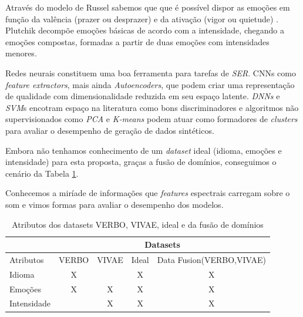 Através do modelo de Russel sabemos que que é possível dispor as emoções em função da valência (prazer ou desprazer) e da ativação (vigor ou quietude) \cite{27}. Plutchik decompõe emoções básicas de acordo com a intensidade, chegando a emoções compostas, formadas a partir de duas emoções com intensidades menores.

Redes neurais constituem uma boa ferramenta para tarefas de \textit{SER}. CNNs como \textit{feature extractors}, mais ainda \textit{Autoencoders}, que podem criar uma representação de qualidade com dimensionalidade reduzida em seu espaço latente. \textit{DNNs} e \textit{SVM}s encotram espaço na literatura como bons discriminadores e algoritmos não supervisionados como \textit{PCA} e \textit{K-means} podem atuar como formadores de \textit{clusters} para avaliar o desempenho de geração de dados sintéticos.

Embora não tenhamos conhecimento de um \textit{dataset} ideal (idioma, emoções e intensidade) para esta proposta, graças a fusão de domínios, conseguimos o cenário da Tabela \ref{table:datasetideal}.

Conhecemos a miríade de informações que \textit{features} espectrais carregam sobre o som e vimos formas para avaliar o desempenho dos modelos.

\begin{table}[!h]
\centering
\label{table:datasetideal}
\caption{Atributos dos datasets VERBO, VIVAE, ideal e da fusão de domínios}
\begin{tabular}{l|cccc|}
\cline{2-5}
 & \multicolumn{4}{c|}{Datasets} \\ \hline
\multicolumn{1}{|l|}{Atributos} & \multicolumn{1}{c|}{VERBO} & \multicolumn{1}{c|}{VIVAE} & \multicolumn{1}{c|}{Ideal} & Data Fusion(VERBO,VIVAE) \\ \hline
\multicolumn{1}{|l|}{Idioma} & \multicolumn{1}{c|}{X} & \multicolumn{1}{c|}{} & \multicolumn{1}{c|}{X} & X \\ \hline
\multicolumn{1}{|l|}{Emoções} & \multicolumn{1}{c|}{X} & \multicolumn{1}{c|}{X} & \multicolumn{1}{c|}{X} & X \\ \hline
\multicolumn{1}{|l|}{Intensidade} & \multicolumn{1}{c|}{} & \multicolumn{1}{c|}{X} & \multicolumn{1}{c|}{X} & X \\ \hline
\end{tabular}
\end{table}

\clearpage

